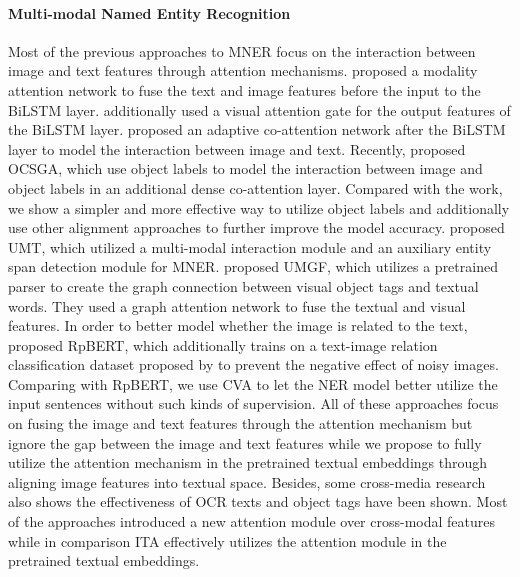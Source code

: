 \documentclass[11pt]{article}
\begin{document}
\paragraph{Multi-modal Named Entity Recognition} 
Most of the previous approaches to MNER focus on the interaction between image and text features through attention mechanisms. \citet{moon-etal-2018-multimodal} proposed a modality attention network to fuse the text and image features before the input to the BiLSTM layer. \citet{lu-etal-2018-visual} additionally used a visual attention gate for the output features of the BiLSTM layer. \citet{zhang2018adaptive} proposed an adaptive co-attention network after the BiLSTM layer to model the interaction between image and text. Recently, \citet{10.1145/3394171.3413650} proposed OCSGA, which use object labels to model the interaction between image and object labels in an additional dense co-attention layer.
Compared with the work, we show a simpler and more effective way to utilize object labels and additionally use other alignment approaches to further improve the model accuracy. \citet{yu-etal-2020-improving-multimodal} proposed UMT, which utilized a multi-modal interaction module and an auxiliary entity span detection module for MNER. \citet{zhang2021multi} proposed UMGF, which utilizes a pretrained parser to create the graph connection between visual object tags and textual words. They used a graph attention network to fuse the textual and visual features. In order to better model whether the image is related to the text, \citet{Sun2021RpBERTAT} proposed RpBERT, which additionally trains on a text-image relation classification dataset proposed by \citet{vempala-preotiuc-pietro-2019-categorizing} to prevent the negative effect of noisy images. Comparing with RpBERT, we use CVA to let the NER model better utilize the input sentences without such kinds of supervision. All of these approaches focus on fusing the image and text features through the attention mechanism but ignore the gap between the image and text features while we propose to fully utilize the attention mechanism in the pretrained textual embeddings through aligning image features into textual space. Besides, some cross-media research also shows the effectiveness of OCR texts \citep{chen2016context,wang-etal-2020-cross-media} and object tags \citep{7780398} have been shown. Most of the approaches introduced a new attention module over cross-modal features while in comparison ITA effectively utilizes the attention module in the pretrained textual embeddings.
\end{document}
